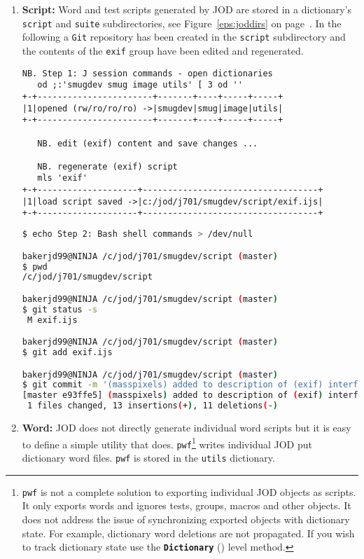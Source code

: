 \begin{enumerate}
\item \textbf{Script:} Word and test scripts generated by JOD are stored
in a dictionary's  \texttt{script} and \texttt{suite} subdirectories, see Figure~\ref{eps:joddirs} on page~\pageref{eps:joddirs}.
In the following a \texttt{Git} repository has been created in the \texttt{script} subdirectory
and the contents of the \texttt{exif} group have been edited and regenerated.

\begin{lstlisting}[frame=single,framerule=0pt,basicstyle=\ttfamily\footnotesize]
   NB. Step 1: J session commands - open dictionaries
   od ;:'smugdev smug image utils' [ 3 od ''
+-+-----------------------+-------+----+-----+-----+
|1|opened (rw/ro/ro/ro) ->|smugdev|smug|image|utils|
+-+-----------------------+-------+----+-----+-----+

   NB. edit (exif) content and save changes ...
   
   NB. regenerate (exif) script
   mls 'exif'
+-+--------------------+-----------------------------------+
|1|load script saved ->|c:/jod/j701/smugdev/script/exif.ijs|
+-+--------------------+-----------------------------------+
\end{lstlisting}

\begin{lstlisting}[language=bash,frame=single,framerule=0pt
,basicstyle=\ttfamily\footnotesize,backgroundcolor=\color{CodeBackGround}]
$ echo Step 2: Bash shell commands > /dev/null

bakerjd99@NINJA /c/jod/j701/smugdev/script (master)
$ pwd
/c/jod/j701/smugdev/script

bakerjd99@NINJA /c/jod/j701/smugdev/script (master)
$ git status -s
 M exif.ijs

bakerjd99@NINJA /c/jod/j701/smugdev/script (master)
$ git add exif.ijs

bakerjd99@NINJA /c/jod/j701/smugdev/script (master)
$ git commit -m '(masspixels) added to description of (exif) interface'
[master e93ffe5] (masspixels) added to description of (exif) interface
 1 files changed, 13 insertions(+), 11 deletions(-)
\end{lstlisting}

\item \textbf{Word:} JOD does not directly generate individual word scripts 
but it is easy to define
a simple utility that does. \texttt{pwf}\footnote{
\texttt{pwf} is not a complete solution to exporting 
individual JOD objects as scripts. It only exports words
 and ignores tests, groups, macros and other objects.
It does not address the issue of synchronizing exported
objects with dictionary state. For example, dictionary word
deletions are not propagated. If you wish to track 
dictionary state use the \textbf{\texttt{Dictionary}} (\pageref{it:dictlev})
level method.}
writes individual JOD put dictionary
word files. \texttt{pwf} is stored in the \texttt{utils} dictionary.


\end{enumerate}
